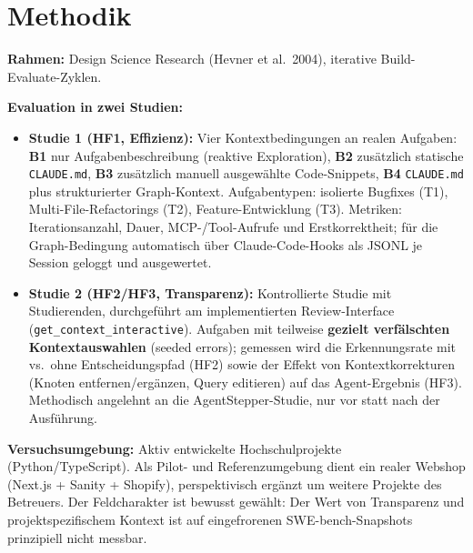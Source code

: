 \documentclass[12pt,a4paper]{scrartcl}
\newcommand{\code}[1]{\texttt{#1}}
\begin{document}
\section{Methodik}

\noindent\textbf{Rahmen:} Design Science Research (Hevner et al.\ 2004), iterative
Build-Evaluate-Zyklen.

\smallskip

\noindent\textbf{Evaluation in zwei Studien:}

\begin{itemize}
  \item \textbf{Studie 1 (HF1, Effizienz):} Vier Kontextbedingungen an realen Aufgaben:
    \textbf{B1} nur Aufgabenbeschreibung (reaktive Exploration), \textbf{B2} zusätzlich
    statische \code{CLAUDE.md}, \textbf{B3} zusätzlich manuell ausgewählte Code-Snippets,
    \textbf{B4} \code{CLAUDE.md} plus strukturierter Graph-Kontext. Aufgabentypen: isolierte
    Bugfixes (T1), Multi-File-Refactorings (T2), Feature-Entwicklung (T3). Metriken:
    Iterationsanzahl, Dauer, MCP-/Tool-Aufrufe und Erstkorrektheit; für die Graph-Bedingung
    automatisch über Claude-Code-Hooks als JSONL je Session geloggt und ausgewertet.
  \item \textbf{Studie 2 (HF2/HF3, Transparenz):} Kontrollierte Studie mit Studierenden,
    durchgeführt am implementierten Review-Interface (\code{get\_context\_interactive}).
    Aufgaben mit teilweise \textbf{gezielt verfälschten Kontextauswahlen} (seeded errors);
    gemessen wird die Erkennungsrate mit vs.\ ohne Entscheidungspfad (HF2) sowie der Effekt von
    Kontextkorrekturen (Knoten entfernen/ergänzen, Query editieren) auf das Agent-Ergebnis
    (HF3). Methodisch angelehnt an die AgentStepper-Studie, nur vor statt nach der
    Ausführung.
\end{itemize}

\noindent\textbf{Versuchsumgebung:} Aktiv entwickelte Hochschulprojekte (Python/TypeScript).
Als Pilot- und Referenzumgebung dient ein realer Webshop (Next.js + Sanity + Shopify),
perspektivisch ergänzt um weitere Projekte des Betreuers. Der Feldcharakter ist bewusst
gewählt: Der Wert von Transparenz und projektspezifischem Kontext ist auf eingefrorenen
SWE-bench-Snapshots prinzipiell nicht messbar.

\end{document}
